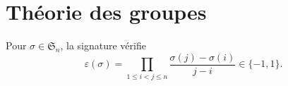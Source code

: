 \section{Théorie des groupes}\label{sec:groupes}
Pour $\sigma \in \mathfrak{S}_n$, la signature vérifie
\[
\varepsilon(\sigma) = \prod_{1 \le i < j \le n} \frac{\sigma(j) - \sigma(i)}{j - i} \in \{-1, 1\}.
\]
